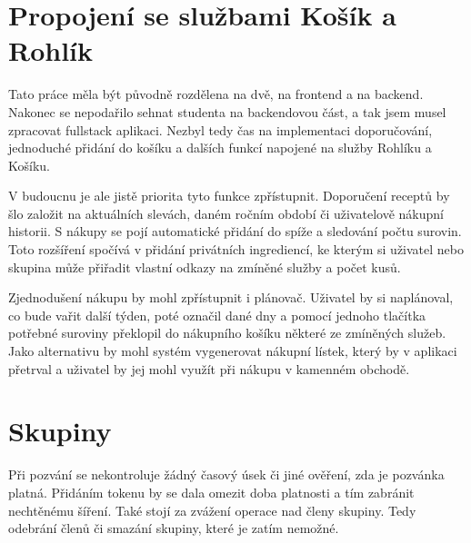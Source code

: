 \section{Propojení se službami Košík a Rohlík}
Tato práce měla být původně rozdělena na dvě, na frontend a na backend. Nakonec se nepodařilo sehnat studenta na backendovou část,
a tak jsem musel zpracovat fullstack aplikaci. Nezbyl tedy čas na implementaci doporučování, jednoduché přidání do košíku a dalších
funkcí napojené na služby Rohlíku a Košíku.

V budoucnu je ale jistě priorita tyto funkce zpřístupnit. Doporučení receptů by šlo založit na aktuálních slevách, daném ročním období či
uživatelově nákupní historii. S nákupy se pojí automatické přidání do spíže a sledování počtu surovin. Toto rozšíření spočívá v přidání
privátních ingrediencí, ke kterým si uživatel nebo skupina může přiřadit vlastní odkazy na zmíněné služby a počet kusů.

Zjednodušení nákupu by mohl zpřístupnit i plánovač. Uživatel by si naplánoval, co bude vařit další týden, poté označil dané dny a pomocí
jednoho tlačítka potřebné suroviny překlopil do nákupního košíku některé ze zmíněných služeb. Jako alternativu by mohl systém vygenerovat
nákupní lístek, který by v aplikaci přetrval a uživatel by jej mohl využít při nákupu v kamenném obchodě.

\section{Skupiny}
Při pozvání se nekontroluje žádný časový úsek či jiné ověření, zda je pozvánka platná. Přidáním tokenu by se dala omezit doba platnosti
a tím zabránit nechtěnému šíření. Také stojí za zvážení operace nad členy skupiny. Tedy odebrání členů či smazání skupiny, které je zatím
nemožné.
